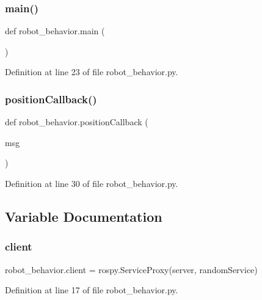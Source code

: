 \subsubsection{\texorpdfstring{main()}{main()}}
{\footnotesize\ttfamily def robot\+\_\+behavior.\+main (\begin{DoxyParamCaption}{ }\end{DoxyParamCaption})}



Definition at line 23 of file robot\+\_\+behavior.\+py.

\mbox{\label{namespacerobot__behavior_a389417033272fd0abc7b55b57cf8aa06}} 
\subsubsection{\texorpdfstring{position\+Callback()}{positionCallback()}}
{\footnotesize\ttfamily def robot\+\_\+behavior.\+position\+Callback (\begin{DoxyParamCaption}\item[{}]{msg }\end{DoxyParamCaption})}



Definition at line 30 of file robot\+\_\+behavior.\+py.



\subsection{Variable Documentation}
\mbox{\label{namespacerobot__behavior_afe11a3139022cf72f927c89b3b7c8364}} 
\subsubsection{\texorpdfstring{client}{client}}
{\footnotesize\ttfamily robot\+\_\+behavior.\+client = rospy.\+Service\+Proxy(\textquotesingle{}server\textquotesingle{}, random\+Service)}



Definition at line 17 of file robot\+\_\+behavior.\+py.

